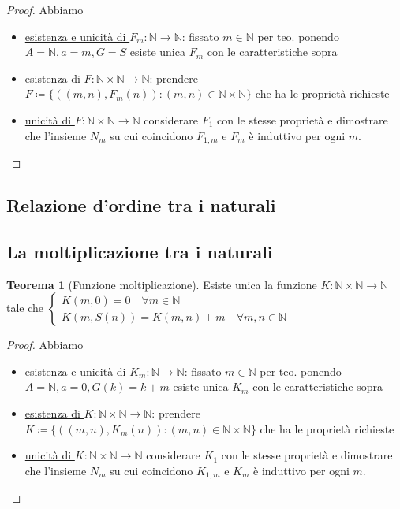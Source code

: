 \documentclass[a4paper,10pt]{article}
\theoremstyle{definition}
\newcommand{\na}{\mathbb{N}} %
\theoremstyle{indentdefinition}
\theoremstyle{indentpostulate}
\theoremstyle{indenttheorem}
\newtheorem{thm}{Teorema}[section]
\theoremstyle{myremark}
\theoremstyle{indentgeneral}
\newenvironment{myboxed} 
{\noindent\begin{lrbox}{\mybox}\begin{minipage}{\textwidth}}
{\end{minipage}\end{lrbox}\fbox{\usebox{\mybox}}}
\begin{document}
\begin{proof} Abbiamo
    \begin{itemize}
        \item \underline{esistenza e unicità di $F_m:\na\to \na$}: fissato $m\in\na$ per teo.  ponendo $A=\na,a=m,G=S$ esiste unica $F_m$ con le caratteristiche sopra
        \item \underline{esistenza di $ F:\na\times \na\to \na$}: prendere $F\coloneqq\{((m,n),F_m(n)): (m,n)\in\na\times\na\}$ che ha le proprietà richieste
        \item \underline{unicità di $ F:\na\times \na\to \na$}  considerare $F_1$ con le stesse proprietà e dimostrare che l'insieme $N_m$ su cui coincidono $F_{1,m}$ e $F_m$ è induttivo per ogni $m$.
        
    \end{itemize}
\end{proof}

\subsection{Relazione d’ordine tra i naturali}
\subsection{La moltiplicazione tra i naturali}
\begin{myboxed}
    \begin{thm}[Funzione moltiplicazione]
        Esiste unica la funzione $K:\mathbb{N}\times \na \to \na$ tale che $\begin{cases}
            K(m,0)=0 \quad \forall m\in \na \\
            K(m,S(n))=K(m,n)+m \quad \forall m,n\in\na
        \end{cases}$ 
    \end{thm}
\end{myboxed}

\begin{proof} Abbiamo
    \begin{itemize}
        \item \underline{esistenza e unicità di $K_m:\na\to \na$}: fissato $m\in\na$ per teo.  ponendo $A=\na,a=0,G(k)=k+m$ esiste unica $K_m$ con le caratteristiche sopra
        \item \underline{esistenza di $ K:\na\times \na\to \na$}: prendere $K\coloneqq\{((m,n),K_m(n)): (m,n)\in\na\times\na\}$ che ha le proprietà richieste
        \item \underline{unicità di $ K:\na\times \na\to \na$}  considerare $K_1$ con le stesse proprietà e dimostrare che l'insieme $N_m$ su cui coincidono $K_{1,m}$ e $K_m$ è induttivo per ogni $m$.
        
    \end{itemize}
\end{proof}
\end{document}
